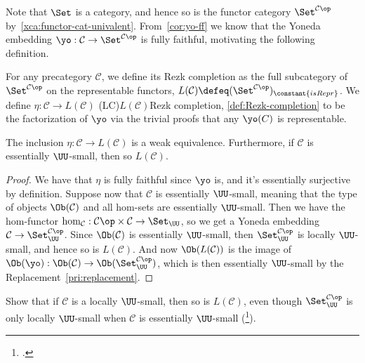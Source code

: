 Note that $\Set$ is a category,
and hence so is the functor category $\Set^{\mathcal C\op}$
by~\cref{xca:functor-cat-univalent}.
From~\cref{cor:yo-ff} we know that the Yoneda embedding
$\yo : \mathcal C \to \Set^{\mathcal C\op}$ is fully faithful,
motivating the following definition.
\begin{definition}\label{def:Rezk-completion}
  For any precategory $\mathcal C$,
  we define its Rezk completion
  as the full subcategory of $\Set^{\mathcal C\op}$
  on the representable functors,
  $L(\mathcal C)\defeq (\Set^{\mathcal C\op})_{\constant{isRepr}}$.
  We define $\eta : \mathcal C \to L(\mathcal C)$%
  \glossary(LC){$L(\mathcal C)$}{Rezk completion, \cref{def:Rezk-completion}}
  to be the factorization of $\yo$ via the trivial proofs that any $\yo(C)$
  is representable.
\end{definition}
\begin{theorem}\label{thm:Rezk-completion}
  The inclusion $\eta:\mathcal C \to L(\mathcal C)$ is a weak equivalence.
  Furthermore, if $\mathcal C$ is essentially $\UU$-small,
  then so $L(\mathcal C)$.
\end{theorem}
\begin{proof}
  We have that $\eta$ is fully faithful since $\yo$ is,
  and it's essentially surjective by definition.
  Suppose now that $\mathcal C$ is essentially $\UU$-small,
  meaning that the type of objects $\Ob(\mathcal C)$
  and all hom-sets are essentially $\UU$-small.
  Then we have the hom-functor
  $\hom_{\mathcal C} : \mathcal C\op \times \mathcal C \to \Set_\UU$,
  so we get a Yoneda embedding $\mathcal C \to \Set_\UU^{\mathcal C\op}$.
  Since $\Ob(\mathcal C)$ is essentially $\UU$-small,
  then $\Set_\UU^{\mathcal C\op}$ is locally $\UU$-small,
  and hence so is $L(\mathcal C)$.
  And now $\Ob(L(\mathcal C))$ is the image of
  $\Ob(\yo) : \Ob(\mathcal C) \to \Ob(\Set_\UU^{\mathcal C\op})$,
  which is then essentially $\UU$-small
  by the Replacement~\cref{pri:replacement}.
\end{proof}
\begin{xca}\label{xca:Rezk-completion-locally-small}
  Show that if $\mathcal C$ is a locally $\UU$-small,
  then so is $L(\mathcal C)$, even though $\Set_\UU^{\mathcal C\op}$
  is only locally $\UU$-small when $\mathcal C$ is essentially $\UU$-small
  (\citeauthor{FreydStreet1995}\footcite{FreydStreet1995}).
\end{xca}

